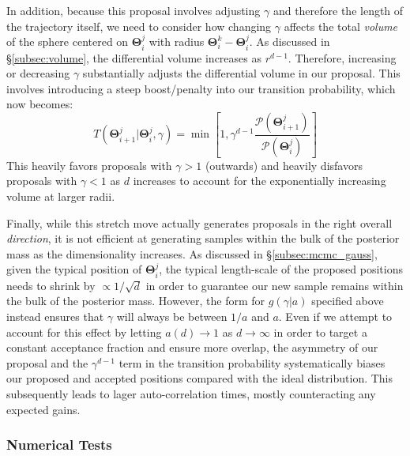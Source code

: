 \documentclass[12pt, titlepage]{article}
\newcommand{\params}{\ensuremath{\boldsymbol\Theta}}
\newcommand{\posterior}{\ensuremath{\mathcal{P}}}
\begin{document}
In addition, because this proposal involves adjusting $\gamma$ and therefore
the length of the trajectory itself, we need to consider how changing $\gamma$
affects the total \textit{volume} of the sphere centered on $\params^j_i$
with radius $\params^k_i-\params^j_i$. As discussed in \S\ref{subsec:volume},
the differential volume increases as $r^{d-1}$. Therefore, increasing
or decreasing $\gamma$ substantially adjusts the differential volume
in our proposal. This involves introducing a steep boost/penalty into our
transition probability, which now becomes:
\begin{equation}
    T(\params_{i+1}^{j}|\params_i^j, \gamma)
    = \min\left[1, \gamma^{d-1} 
    \frac{\posterior(\params^j_{i+1})}{\posterior(\params_i^j)}\right]
\end{equation}
This heavily favors proposals with $\gamma > 1$ (outwards) and heavily
disfavors proposals with $\gamma < 1$ as $d$ increases to account for the
exponentially increasing volume at larger radii.

Finally, while this stretch move actually generates proposals 
in the right overall \textit{direction}, it is not efficient at generating
samples within the bulk of the posterior mass
as the dimensionality increases.
As discussed in \S\ref{subsec:mcmc_gauss}, given the typical
position of $\params_i^j$, the typical length-scale of
the proposed positions needs to shrink by
$\propto 1/\sqrt{d}$ in order to guarantee our new sample
remains within the bulk of the posterior mass.
However, the form for $g(\gamma|a)$ specified above 
instead ensures that $\gamma$ will always be between $1/a$ and $a$.
Even if we attempt to account for this effect by letting 
$a(d) \rightarrow 1$ as $d \rightarrow \infty$ in order to
target a constant acceptance fraction and ensure more overlap, 
the asymmetry of our proposal and the $\gamma^{d-1}$ term
in the transition probability systematically biases our
proposed and accepted positions compared with the ideal distribution.
This subsequently leads to lager auto-correlation times, mostly
counteracting any expected gains.

\subsubsection*{Numerical Tests} \label{subsubsec:sims_2}
\end{document}
